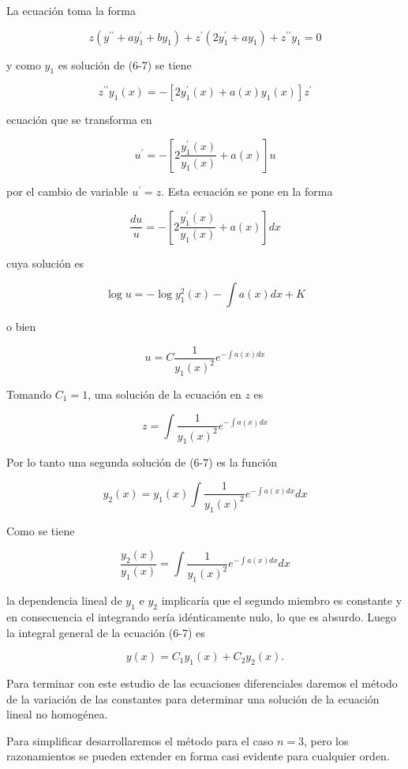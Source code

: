 \documentclass[10pt]{article}
\theoremstyle{plain}
\theoremstyle{definition}
\theoremstyle{remark}
\begin{document}
La ecuación toma la forma

$$
z\left(y^{\prime \prime}+a y_{1}^{\prime}+b y_{1}\right)+z^{\prime}\left(2 y_{1}^{\prime}+a y_{1}\right)+z^{\prime \prime} y_{1}=0
$$

y como $y_{1}$ es solución de (6-7) se tiene

$$
z^{\prime \prime} y_{1}(x)=-\left[2 y_{1}^{\prime}(x)+a(x) y_{1}(x)\right] z^{\prime}
$$

ecuación que se transforma en

$$
u^{\prime}=-\left[2 \frac{y_{1}^{\prime}(x)}{y_{1}(x)}+a(x)\right] u
$$

por el cambio de variable $u^{\prime}=z$. Esta ecuación se pone en la forma

$$
\frac{d u}{u}=-\left[2 \frac{y_{1}^{\prime}(x)}{y_{1}(x)}+a(x)\right] d x
$$

cuya solución es

$$
\log u=-\log y_{1}^{2}(x)-\int a(x) d x+K
$$

o bien

$$
u=C \frac{1}{y_{1}(x)^{2}} e^{-\int a(x) d x}
$$

Tomando $C_{1}=1$, una solución de la ecuación en $z$ es

$$
z=\int \frac{1}{y_{1}(x)^{2}} e^{-\int a(x) d x}
$$

Por lo tanto una segunda solución de (6-7) es la función


\begin{equation*}
y_{2}(x)=y_{1}(x) \int \frac{1}{y_{1}(x)^{2}} e^{-\int a(x) d x} d x \tag{$6\cdot8$}
\end{equation*}


Como se tiene

$$
\frac{y_{2}(x)}{y_{1}(x)}=\int \frac{1}{y_{1}(x)^{2}} e^{-\int a(x) d x} d x
$$

la dependencia lineal de $y_{1}$ e $y_{2}$ implicaría que el segundo miembro es constante y en consecuencia el integrando sería idénticamente nulo, lo que es absurdo. Luego la integral general de la ecuación (6-7) es

$$
y(x)=C_{1} y_{1}(x)+C_{2} y_{2}(x) .
$$

Para terminar con este estudio de las ecuaciones diferenciales daremos el método de la variación de las constantes para determinar una solución de la ecuación lineal no homogénea.

Para simplificar desarrollaremos el método para el caso $n=3$, pero los razonamientos se pueden extender en forma casi evidente para cualquier orden.
\end{document}

